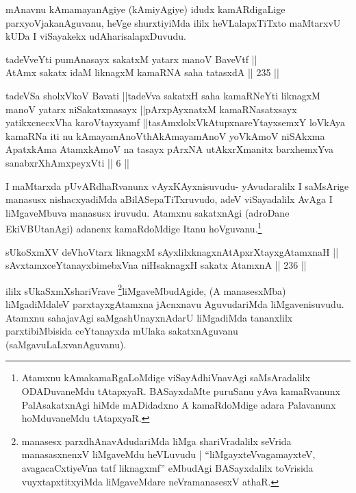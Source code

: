 \begin{artha}
mAnavnu kAmamayanAgiye (kAmiyAgiye) idudx kamARdigaLige
parxyoVjakanAguvanu, heVge shurxtiyiMda ililx heVLalapxTiTxto
maMtarxvU kUDa I viSayakekx udAharisalapxDuvudu.
\end{artha}


\begin{shl}
tadeVveYti pumAnasayx sakatxM yatarx manoV BaveVtf || \\
AtAmx sakatx idaM liknagxM kamaRNA saha tatasxdA \hfill || 235 ||  
\end{shl}

\begin{shl}
tadeVSa sholxVkoV Bavati ||tadeVva sakatxH saha kamaRNeYti liknagxM manoV yatarx niSakatxmasayx ||pArxpAyxnatxM kamaRNasatxsayx yatikxcnecxVha karoVtayxyamf ||tasAmxlolxVkAtupxnareYtayxsemxY loVkAya kamaRNa iti nu kAmayamAnoV\s thAkAmayamAnoV yoV\s kAmoV niSAkxma ApatxkAma AtamxkAmoV na tasayx pArxNA utAkxrXmanitx barxhemxYva sanabxrXhAmxpeyxVti || 6 ||
\end{shl}

\begin{artha}
I maMtarxda pUvARdhaRvanunx vAyxKAyxnisuvudu- yAvudaralilx I
saMsArige manasusx nishacxyadiMda aBilASepaTiTxruvudo, adeV
viSayadalilx AvAga I liMgaveMbuva manasusx iruvudu. Atamxnu sakatxnAgi
(adroDane EkiVBUtanAgi) adanenx kamaRdoMdige Itanu
hoVguvanu.\footnote{Atamxnu kAmakamaRgaLoMdige viSayAdhiVnavAgi
saMsAradalilx ODADuvaneMdu tAtapxyaR. BASayxdaMte puruSanu yAva
kamaRvanunx PalAsakatxnAgi hiMde mADidadxno A kamaRdoMdige adara
Palavanunx hoMduvaneMdu tAtapxyaR.}
\end{artha}


\begin{shl}
sUkoSxmXV deVhoV\s tarx liknagxM sAyxlilxknagxnAtApxrXtayxgAtamxnaH || \\
sAvxtamxceYtanayxbimebxVna niHsaknagxH sakatx AtamxnA \hfill || 236 ||  
\end{shl}

\begin{artha}
ililx sUkaSxmXshariVrave \footnote{manasesx parxdhAnavAdudariMda liMga
shariVradalilx seVrida manasasxnenxV liMgaveMdu heVLuvudu |
``liMgayxteV\s vagamayxteV, avagacaCxtiyeVna tatf liknagxmf'' eMbudAgi BASayxdalilx toVrisida vuyxtapxtitxyiMda
liMgaveMdare neVramanasesxV athaR.}liMgaveMbudAgide, (A manasesxMba)
liMgadiMdaleV parxtayxgAtamxna jAcnxnavu AguvudariMda liMgavenisuvudu.
Atamxnu sahajavAgi saMgashUnayxnAdarU liMgadiMda tananxlilx
parxtibiMbisida ceYtanayxda mUlaka sakatxnAguvanu
(saMgavuLaLxvanAguvanu).
\end{artha}

